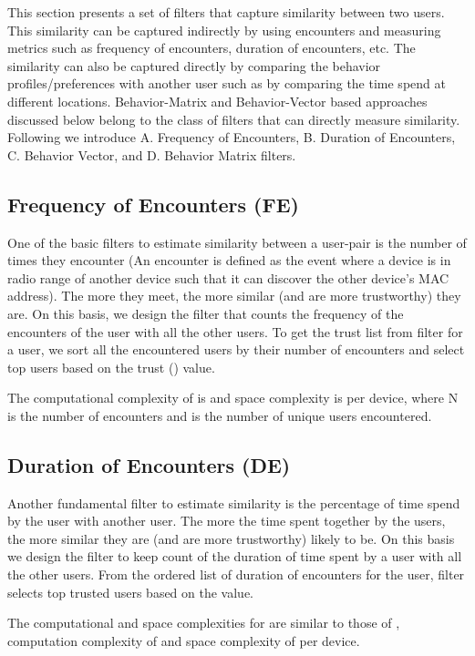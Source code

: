 \documentclass[10pt,conference]{IEEEtran}
\begin{document}
This section presents a set of filters that capture similarity between two users. This similarity can be captured indirectly by using encounters  and measuring metrics such as frequency of encounters, duration of encounters, etc. The similarity can also be captured directly by comparing the behavior profiles/preferences with another user such as by comparing the time spend at different locations. Behavior-Matrix and Behavior-Vector based approaches discussed below belong to the class of filters that can directly measure similarity.  Following we introduce A. Frequency of Encounters, B. Duration of Encounters, C. Behavior Vector, and D. Behavior Matrix filters.



\subsection{Frequency of Encounters (FE)}
One of the basic filters to estimate similarity between a user-pair is the number of times they encounter (An encounter is defined as the event where a device is in radio range of another device such that it can discover the other device's MAC address).  The more they meet, the more similar (and are more trustworthy) they are.  On this basis, we design  the  filter that counts the frequency of the encounters of the user with all the other users. To get the trust list from  filter for a user, we sort all the encountered users by their number of encounters and select top users based on the trust () value. 

The computational complexity of  is  and space complexity is  per device, where N is the number of encounters and  is the number of unique users encountered.


\subsection{Duration of Encounters (DE)}
Another fundamental filter to estimate similarity is the percentage of time spend by the user with another user. The more the time spent together by the users, the more similar they are (and are more trustworthy) likely to be. On this basis we design the  filter to keep count of the duration of time spent by a user with all the other users. From the ordered list of duration of encounters for the user,  filter selects top trusted users based on the  value. 

The computational and space complexities for  are similar to those of , computation complexity of  and space complexity of  per device.
\end{document}
